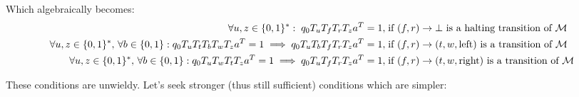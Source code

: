 Which algebraically becomes:
\begin{align*}
    \forall u,z\in\{0, 1\}^*: \; q_0 T_u T_f T_r T_z a^T = 1, \;                                                                           & \text{if $(f,r) \to \bot$ is a halting transition of $\mathcal{M}$}
    \\
    \forall u,z\in\{0, 1\}^*,\,\forall b \in \{0, 1\}: q_0 T_{u} T_t T_b T_w T_{z} a^T = 1 \implies q_0 T_{u} T_b T_f T_r T_{z} a^T = 1,\; & \text{if $(f,r) \to (t,w,\text{left})$ is a transition of $\mathcal{M}$}
    \\
    \forall u,z\in\{0, 1\}^*,\,\forall b \in \{0, 1\}: q_0 T_{u} T_w T_t T_{z} a^T = 1 \implies q_0 T_{u} T_f T_r T_{z} a^T = 1,\;         & \text{if $(f,r) \to (t,w,\text{right})$ is a transition of $\mathcal{M}$}
\end{align*}

These conditions are unwieldy. Let's seek stronger (thus still sufficient) conditions which are simpler:

